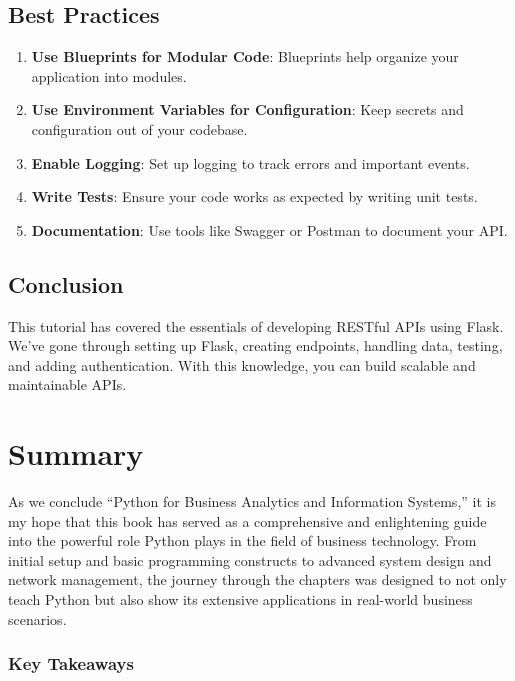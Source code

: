 \documentclass[
  letterpaper,
  DIV=11,
  numbers=noendperiod]{scrreprt}
\providecommand{\tightlist}{%
  \setlength{\itemsep}{0pt}\setlength{\parskip}{0pt}}\usepackage{longtable,booktabs,array}
\begin{document}
\section{Best Practices}\label{best-practices-11}

\begin{enumerate}
\def\labelenumi{\arabic{enumi}.}
\tightlist
\item
  \textbf{Use Blueprints for Modular Code}: Blueprints help organize
  your application into modules.
\item
  \textbf{Use Environment Variables for Configuration}: Keep secrets and
  configuration out of your codebase.
\item
  \textbf{Enable Logging}: Set up logging to track errors and important
  events.
\item
  \textbf{Write Tests}: Ensure your code works as expected by writing
  unit tests.
\item
  \textbf{Documentation}: Use tools like Swagger or Postman to document
  your API.
\end{enumerate}

\section{Conclusion}\label{conclusion-54}

This tutorial has covered the essentials of developing RESTful APIs
using Flask. We've gone through setting up Flask, creating endpoints,
handling data, testing, and adding authentication. With this knowledge,
you can build scalable and maintainable APIs.


\chapter{Summary}\label{summary}

As we conclude ``Python for Business Analytics and Information
Systems,'' it is my hope that this book has served as a comprehensive
and enlightening guide into the powerful role Python plays in the field
of business technology. From initial setup and basic programming
constructs to advanced system design and network management, the journey
through the chapters was designed to not only teach Python but also show
its extensive applications in real-world business scenarios.

\subsection{Key Takeaways}\label{key-takeaways}
\end{document}
